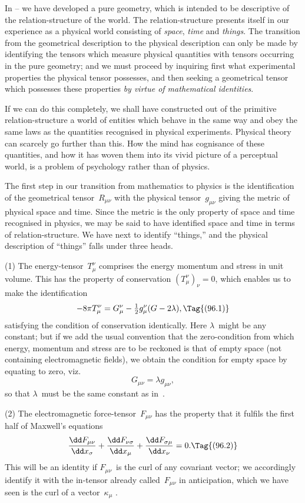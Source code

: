 \documentclass[12pt]{book}
\begin{document}
In -- we have developed a pure geometry, which is intended to be descriptive
of the relation-structure of the world. The relation-structure presents
itself in our experience as a physical world consisting of \emph{space}, \emph{time} and \emph{things}.
The transition from the geometrical description to the physical description
can only be made by identifying the tensors which measure physical quantities
with tensors occurring in the pure geometry; and we must proceed by
inquiring first what experimental properties the physical tensor possesses,
and then seeking a geometrical tensor which possesses these properties \emph{by
virtue of mathematical identities}.

If we can do this completely, we shall have constructed out of the primitive
relation-structure a world of entities which behave in the same way and obey
the same laws as the quantities recognised in physical experiments. Physical
theory can scarcely go further than this. How the mind has cognisance of
these quantities, and how it has woven them into its vivid picture of a perceptual
world, is a problem of psychology rather than of physics.

The first step in our transition from mathematics to physics is the identification
of the geometrical tensor~$R_{\mu\nu}$ with the physical tensor~$g_{\mu\nu}$ giving the
metric of physical space and time. Since the metric is the only property of
space and time recognised in physics, we may be said to have identified space
and time in terms of relation-structure. We have next to identify ``things,''
and the physical description of ``things'' falls under three heads.

(1) The energy-tensor~$T_{\mu}^{\nu}$ comprises the energy momentum and stress in
unit volume. This has the property of conservation $(T_{\mu}^{\nu})_{\nu} = 0$, which enables
us to make the identification
\[
-8\pi T_{\mu}^{\nu} = G_{\mu}^{\nu} - \tfrac{1}{2} g_{\mu}^{\nu}(G - 2\lambda),
\Tag{(96.1)}
\]
satisfying the condition of conservation identically. Here $\lambda$~might be any
constant; but if we add the usual convention that the zero-condition from
which energy, momentum and stress are to be reckoned is that of empty space
(not containing electromagnetic fields), we obtain the condition for empty
space by equating  to zero, viz.\
\[
G_{\mu\nu} = \lambda g_{\mu\nu},
\]
so that $\lambda$~must be the same constant as in~.

(2) The electromagnetic force-tensor~$F_{\mu\nu}$ has the property that it fulfils
the first half of Maxwell's equations
\[
\frac{\dd F_{\mu\nu}}{\dd x_{\sigma}}
+ \frac{\dd F_{\nu\sigma}}{\dd x_{\mu}}
+ \frac{\dd F_{\sigma\mu}}{\dd x_{\nu}} = 0.
\Tag{(96.2)}
\]
This will be an identity if $F_{\mu\nu}$~is the curl of any covariant vector; we
accordingly identify it with the in-tensor already called~$F_{\mu\nu}$ in anticipation,
which we have seen is the curl of a vector~$\kappa_{\mu}$ \Eq{(94.62)}.
\end{document}
